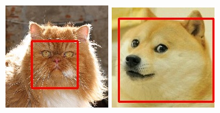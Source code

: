 \documentclass[conference,compsoc]{IEEEtran}
\begin{document}
\begin{figure}
	\begin{multicols}{4}
    		\includegraphics[height=1.2\linewidth]{goodFace2.jpg}\par 
    		\includegraphics[height=1.2\linewidth]{dogeFace.jpg}\par 

\end{multicols}
\end{figure}
\end{document}

